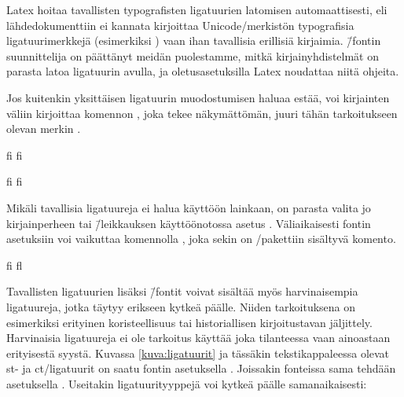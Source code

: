 
Latex hoitaa tavallisten typografisten ligatuurien latomisen
automaattisesti, eli lähdedokumenttiin ei kannata kirjoittaa
Unicode\-/merkistön typografisia ligatuurimerkkejä (esimerkiksi
) vaan ihan tavallisia
erillisiä kirjaimia.  \=/fontin suunnittelija on
päättänyt meidän puolestamme, mitkä kir\-jain\-yh\-dis\-tel\-mät on
parasta latoa ligatuurin avulla, ja ole\-tus\-ase\-tuk\-sil\-la Latex
noudattaa niitä ohjeita.

Jos kuitenkin yksittäisen ligatuurin muodostumisen haluaa estää, voi
kirjainten väliin kirjoittaa komennon , joka tekee näkymättömän, juuri tähän
tarkoitukseen olevan merkin .


\begin{koodilohkosis}
  fi f\textcompwordmark i
\end{koodilohkosis}

\begin{tulossis}
  fi f\textcompwordmark i
\end{tulossis}

Mikäli tavallisia ligatuureja ei halua käyttöön lainkaan, on parasta
valita jo kirjainperheen tai \=/leikkauksen käyttöönotossa asetus
. Väliaikaisesti fontin asetuksiin
voi vaikuttaa komennolla , joka sekin
on \-/pakettiin sisältyvä komento.

\begin{koodilohkosis}
  { fi fl}
\end{koodilohkosis}

Tavallisten ligatuurien lisäksi  \=/fontit voivat
sisältää myös harvinaisempia ligatuureja, jotka täytyy erikseen kytkeä
päälle. Niiden tarkoituksena on esimerkiksi erityinen koristeellisuus
tai historiallisen kirjoitustavan jäljittely. Harvinaisia ligatuureja ei
ole tarkoitus käyttää joka tilanteessa vaan ainoastaan erityisestä
syystä. Kuvassa \ref{kuva:ligatuurit} ja tässäkin tekstikappaleessa
olevat {%
  \newcommand{\hlig}[1]{{\erikoisfontti
      #1}}%
  \hlig{st}- ja \hlig{ct}\-/ligatuurit%
} on saatu fontin asetuksella .
Joissakin fonteissa sama tehdään asetuksella . Useitakin ligatuurityyppejä voi kytkeä päälle
samanaikaisesti:

